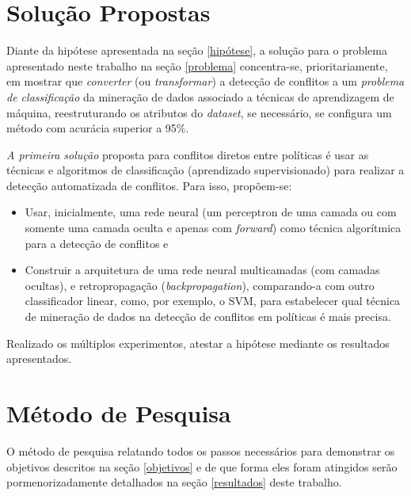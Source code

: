 \section{Solução Propostas}\label{solucao_proposta}
Diante da hipótese apresentada na seção \ref{hipótese}, a solução para o problema apresentado neste trabalho na seção \ref{problema} concentra-se, prioritariamente, em mostrar que \textit{converter} (ou \textit{transformar}) a detecção de conflitos a um \textit{problema de classificação} da mineração de dados associado a técnicas de aprendizagem de máquina, reestruturando os atributos do \textit{dataset}, se necessário, se configura um método com acurácia superior a 95\%.

\textit{A primeira solução} proposta para conflitos diretos entre políticas é usar as técnicas e algoritmos de classificação (aprendizado supervisionado) para  realizar a detecção automatizada de conflitos. Para isso, propõem-se:
\begin{itemize}
	\item Usar, inicialmente, uma rede neural (um perceptron de uma camada ou com somente uma camada oculta e apenas com \textit{forward}) como técnica algorítmica para a detecção de conflitos e
	\item Construir a arquitetura de uma rede neural multicamadas (com camadas ocultas), e retropropagação (\textit{backpropagation}), comparando-a com outro classificador linear, como, por exemplo, o SVM, para estabelecer qual técnica de mineração de dados na detecção de conflitos em políticas é mais precisa.	
\end{itemize}
Realizado os múltiplos experimentos, atestar a hipótese mediante os resultados apresentados.

\section{Método de Pesquisa} 
O método de pesquisa relatando todos os passos necessários para demonstrar os objetivos descritos na seção \ref{objetivos} e de que forma eles foram atingidos serão pormenorizadamente detalhados na seção \ref{resultados} deste trabalho.

